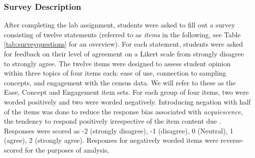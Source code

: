 \documentclass{article}\usepackage[]{graphicx}\usepackage[]{color}
\begin{document}
 \subsubsection{Survey Description} 

After completing the lab assignment, students were asked to fill out a survey consisting of twelve statements (referred to as {\it items} in the following, see Table \ref{tab:surveyquestions} for an overview). For each statement, students were asked for feedback on their level of agreement on a Likert scale from strongly disagree to strongly agree. 
The twelve items were designed to assess student opinion within three topics of four items each: ease of use, connection to sampling concepts, and engagement with the census data.  We will refer to these as the Ease, Concept and Engagement item sets.  For each group of four items, two were worded positively and two were worded negatively. Introducing negation with half of the items was done to reduce the response bias associated with \textit{acquiescence}, the tendency to respond positively irrespective of the item content due \citep{Furnham1986}. Responses were scored as -2 (strongly disagree), -1 (disagree), 0 (Neutral), 1 (agree), 2 (strongly agree).  Responses for negatively worded items were reverse-scored for the purposes of analysis,
\end{document}
